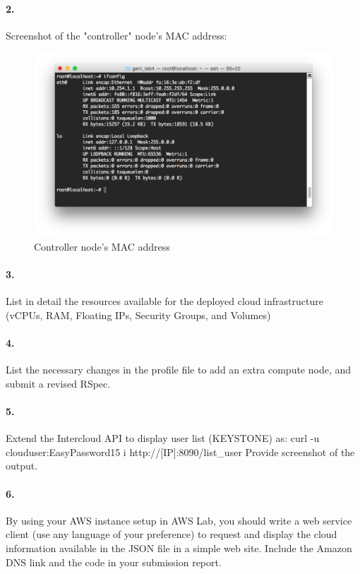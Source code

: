 \documentclass[a4paper]{article}
\begin{document}
\paragraph{2. } Screenshot of the "controller" node's MAC address: \\
\begin{figure}[H]
  \centering
    \includegraphics[scale=.54]{mac_address.png}
  \caption{Controller node's MAC address}
\end{figure}

\paragraph{3. } List in detail the resources available for the deployed cloud infrastructure (vCPUs, RAM, Floating IPs, Security Groups, and Volumes)

\paragraph{4. } List the necessary changes in the profile file to add an extra compute node, and submit a revised RSpec.

\paragraph{5. } Extend the Intercloud API to display user list (KEYSTONE) as:
curl -u clouduser:EasyPassword15 \-i http://[IP]:8090/list\_user Provide screenshot of the output.

\paragraph{6. } By using your AWS instance setup in AWS Lab, you should write a web service client (use any language of your preference) to request and display the cloud information available in the JSON file in a simple web site. Include the Amazon DNS link and the code in your submission report.
\end{document}
